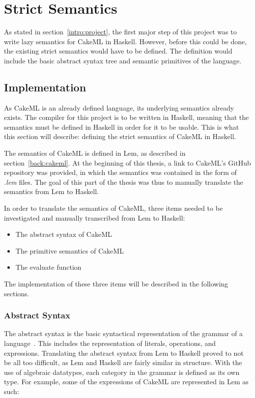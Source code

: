 \chapter{Strict Semantics}
\label{chapter:strict}
As stated in section~\ref{intro:project}, the first major step of this project
was to write lazy semantics for CakeML in Haskell. However, before this could be
done, the existing strict semantics would have to be defined. The definition
would include the basic abstract syntax tree and semantic primitives of the
language.

\section{Implementation}
As CakeML is an already defined language, its underlying semantics already
exists. The compiler for this project is to be written in Haskell, meaning that
the semantics must be defined in Haskell in order for it to be usable. This is
what this section will describe: defining the strict semantics of CakeML in
Haskell.

The semantics of CakeML is defined in Lem, as described in
section~\ref{back:cakeml}. At the beginning of this thesis, a link to CakeML's
GitHub repository was provided, in which the semantics was contained in the form
of \textit{.lem} files. The goal of this part of the thesis was thus to manually
translate the semantics from Lem to Haskell. 

In order to translate the semantics of CakeML, three items needed to be
investigated and manually transcribed from Lem to Haskell:
\begin{itemize}
\item The abstract syntax of CakeML
\item The primitive semantics of CakeML
\item The evaluate function
\end{itemize}

\noindent The implementation of these three items will be described in the
following sections.

\subsection{Abstract Syntax}
The abstract syntax is the basic syntactical representation of the grammar of a
language~\cite{pltbook}. This includes the representation of literals,
operations, and expressions. Translating the abstract syntax from Lem to Haskell
proved to not be all too difficult, as Lem and Haskell are fairly similar in
structure. With the use of algebraic datatypes, each category in the grammar is
defined as its own type. For example, some of the expressions of CakeML
are represented in Lem as such:

